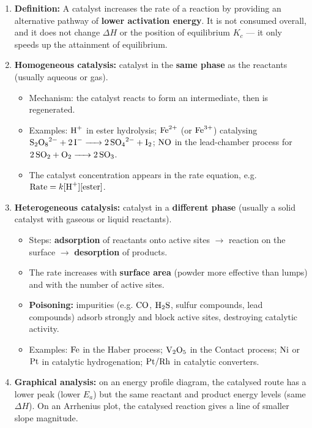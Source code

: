 \documentclass[11pt]{article}
\begin{document}
\begin{methode}
\begin{enumerate}
\item \textbf{Definition:} A catalyst increases the rate of a reaction by providing an alternative pathway of \textbf{lower activation energy}. It is not consumed overall, and it does not change $\Delta H$ or the position of equilibrium $K_c$ — it only speeds up the attainment of equilibrium.
\item \textbf{Homogeneous catalysis:} catalyst in the \textbf{same phase} as the reactants (usually aqueous or gas).
    \begin{itemize}
    \item Mechanism: the catalyst reacts to form an intermediate, then is regenerated.
    \item Examples: $\ce{H+}$ in ester hydrolysis; $\ce{Fe^{2+}}$ (or $\ce{Fe^{3+}}$) catalysing $\ce{S2O8^2- + 2I- -> 2SO4^2- + I2}$; $\ce{NO}$ in the lead-chamber process for $\ce{2SO2 + O2 -> 2SO3}$.
    \item The catalyst concentration appears in the rate equation, e.g. $\text{Rate} = k[\ce{H+}][\text{ester}]$.
    \end{itemize}
\item \textbf{Heterogeneous catalysis:} catalyst in a \textbf{different phase} (usually a solid catalyst with gaseous or liquid reactants).
    \begin{itemize}
    \item Steps: \textbf{adsorption} of reactants onto active sites $\to$ reaction on the surface $\to$ \textbf{desorption} of products.
    \item The rate increases with \textbf{surface area} (powder more effective than lumps) and with the number of active sites.
    \item \textbf{Poisoning:} impurities (e.g. $\ce{CO}$, $\ce{H2S}$, sulfur compounds, lead compounds) adsorb strongly and block active sites, destroying catalytic activity.
    \item Examples: $\ce{Fe}$ in the Haber process; $\ce{V2O5}$ in the Contact process; $\ce{Ni}$ or $\ce{Pt}$ in catalytic hydrogenation; $\ce{Pt}/\ce{Rh}$ in catalytic converters.
    \end{itemize}
\item \textbf{Graphical analysis:} on an energy profile diagram, the catalysed route has a lower peak (lower $E_a$) but the same reactant and product energy levels (same $\Delta H$). On an Arrhenius plot, the catalysed reaction gives a line of smaller slope magnitude.
\end{enumerate}
\end{methode}
\end{document}
